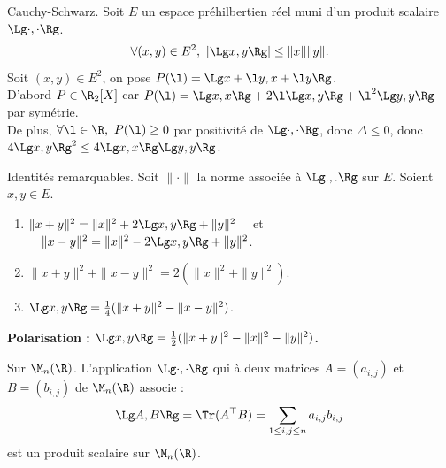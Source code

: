 \documentclass[11pt]{article}
\begin{document}
\vspace*{-0.8cm}

\begin{prop}{Cauchy-Schwarz.}{}
    Soit $E$ un espace préhilbertien réel muni d'un produit scalaire $\Lg\cdot,\cdot\Rg$.
    \begin{equation*}
        \forall (x,y) \in E^2, ~ \left| \Lg x, y \Rg \right| \leq \|x\|\|y\|.
    \end{equation*}
    \tcblower
    Soit $(x,y)\in E^2$, on pose $P(\l)=\Lg x + \l y, x + \l y \Rg$.\\
    D'abord $P\in\R_2[X]$ car $P(\l)=\Lg x, x \Rg + 2\l \Lg x, y \Rg + \l^2 \Lg y, y \Rg$ par symétrie.\\
    De plus, $\forall \l \in \R, ~ P(\l)\geq 0$ par positivité de $\Lg\cdot,\cdot\Rg$, donc $\Delta \leq 0$, donc $4\Lg x, y \Rg^2 \leq 4\Lg x, x \Rg\Lg y, y\Rg$.
\end{prop}

\vspace*{-0.8cm}

\begin{prop}{Identités remarquables.}{}
    Soit $\|\cdot\|$ la norme associée à $\Lg.,.\Rg$ sur $E$. Soient $x,y\in E$.
    \begin{enumerate}
        \item $\|x+y\|^2=\|x\|^2+2\Lg x,y \Rg + \|y\|^2 \quad$ et $\quad \|x-y\|^2=\|x\|^2-2\Lg x,y \Rg + \|y\|^2$.
        \item $\|x+y\|^2+\|x-y\|^2=2(\|x\|^2+\|y\|^2)$.
        \item $\Lg x,y \Rg=\frac{1}{4}(\|x+y\|^2-\|x-y\|^2)$.
    \end{enumerate}
    \bf{Polarisation :} $\Lg x, y \Rg = \frac{1}{2}(\|x+y\|^2 - \|x\|^2 - \|y\|^2)$.
\end{prop}

\begin{defi}{Sur $\M_n(\R)$.}{}
    L'application $\Lg \cdot,\cdot \Rg$ qui à deux matrices $A=(a_{i,j})$ et $B=(b_{i,j})$ de $\M_n(\R)$ associe :
    \begin{equation*}
        \Lg A, B \Rg = \Tr(A^\top B) = \sum_{1\leq i,j \leq n} a_{i,j}b_{i,j}
    \end{equation*}
    est un produit scalaire sur $\M_n(\R)$.
\end{defi}
\end{document}
